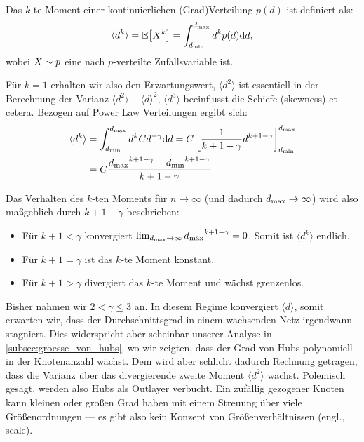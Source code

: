 Das $k$-te Moment einer kontinuierlichen (Grad)Verteilung $p(d)$ ist definiert als:
\begin{align}
    \langle d^k \rangle = \mathbb{E}\!\left[X^k\right] = \int_{{d_{\text{min}}}}^{{d_{\text{max}}}} d^k p(d) \text d d,
\end{align}
wobei $X \sim p$ eine nach $p$-verteilte Zufallsvariable ist.

Für $k=1$ erhalten wir also den Erwartungswert, $\langle d^2 \rangle$ ist essentiell in der Berechnung der Varianz $\langle d^2 \rangle - \langle d \rangle^2$, $\langle d^3 \rangle$ beeinflusst die Schiefe (skewness) et cetera.
Bezogen auf Power Law Verteilungen ergibt sich:
\begin{align}
    \langle d^k \rangle
     & = \int_{{d_{\text{min}}}}^{{d_{\text{max}}}} d^k C d^{-\gamma} \text d d
    = C \left[ \frac{1}{k + 1 - \gamma} d^{k + 1 -\gamma}\right]_{{d_{\text{min}}}}^{{d_{\text{max}}}}    \\
     & = C \frac{{d_{\text{max}}}^{k + 1 -\gamma} - {d_{\text{min}}}^{k + 1 -\gamma}}{k + 1 - \gamma}
\end{align}

Das Verhalten des $k$-ten Moments für $n \to \infty$ (und dadurch ${d_{\text{max}}} \to \infty$) wird also maßgeblich durch $k + 1 - \gamma$ beschrieben:
\begin{itemize}
    \item Für $k + 1 < \gamma$ konvergiert $\lim_{{d_{\text{max}}} \to \infty} {d_{\text{max}}}^{k + 1 -\gamma} = 0$.
          Somit ist $\langle d^k \rangle$ endlich.

    \item Für $k + 1 = \gamma$ ist das $k$-te Moment konstant.

    \item Für $k + 1 > \gamma$ divergiert das $k$-te Moment und wächst grenzenlos.
\end{itemize}

\noindent
Bisher nahmen wir $2 < \gamma \le 3$ an.
In diesem Regime konvergiert $\langle d \rangle$, somit erwarten wir, dass der Durchschnittsgrad in einem wachsenden Netz irgendwann stagniert.
Dies widerspricht aber scheinbar unserer Analyse in \cref{subsec:groesse_von_hubs}, wo wir zeigten, dass der Grad von Hubs polynomiell in der Knotenanzahl wächst.
Dem wird aber schlicht dadurch Rechnung getragen, dass die Varianz über das divergierende zweite Moment $\langle d^2 \rangle$ wächst.
Polemisch gesagt, werden also Hubs als Outlayer verbucht.
Ein zufällig gezogener Knoten kann kleinen oder großen Grad haben mit einem Streuung über viele Größenordnungen --- es gibt also kein Konzept von Größenverhältnissen (engl., scale).